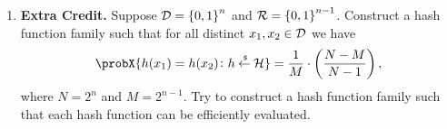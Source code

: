 \documentclass[11pt]{article}
\newcommand{\nextoddpage}{\checkoddpage\ifoddpage{\ \newpage\ \newpage}\else{\ \newpage}\fi}
\begin{document}
\begin{enumerate}
\nextoddpage 
\item {\bfseries Extra Credit.} 
  Suppose ${\mathcal D}={\{0,1\}}^n$ and ${\mathcal R}={\{0,1\}}^{n-1}$. 
  Construct a hash function family such that for all distinct $x_1,x_2\in{\mathcal D}$ we have 
  $$\probX{h(x_1)=h(x_2)\colon h\getsr\cH} = \frac1M \cdot\left(\frac{N-M}{N-1}\right),$$
  where $N=2^n$ and $M=2^{n-1}$.  
  Try to construct a hash function family such that each hash function can be efficiently evaluated. 
 



\end{enumerate}
\end{document}

